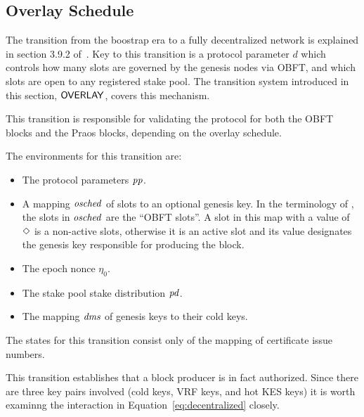 \clearpage

\subsection{Overlay Schedule}
\label{sec:overlay-schedule}

The transition from the boostrap era to a fully decentralized network is explained in
section 3.9.2 of~\cite{delegation_design}.
Key to this transition is a protocol parameter $d$ which controls how many slots are governed by
the genesis nodes via OBFT, and which slots are open to any registered stake pool.
The transition system introduced in this section, $\mathsf{OVERLAY}$, covers this mechanism.

This transition is responsible for validating the protocol for both the OBFT blocks
and the Praos blocks, depending on the overlay schedule.

The environments for this transition are:
\begin{itemize}
  \item The protocol parameters $\mathit{pp}$.
  \item A mapping $\mathit{osched}$ of slots to an optional genesis key.
    In the terminology of \cite{delegation_design},
    the slots in $\mathit{osched}$ are the ``OBFT slots''.
    A slot in this map with a value of $\Diamond$ is a non-active slots,
    otherwise it is an active slot and its value designates the genesis key
    responsible for producing the block.
  \item The epoch nonce $\eta_0$.
  \item The stake pool stake distribution $\mathit{pd}$.
  \item The mapping $\mathit{dms}$ of genesis keys to their cold keys.
\end{itemize}

The states for this transition consist only of the mapping of certificate issue numbers.

This transition establishes that a block producer is in fact authorized.
Since there are three key pairs involved (cold keys, VRF keys, and hot KES keys)
it is worth examinng the interaction in Equation~\ref{eq:decentralized} closely.


